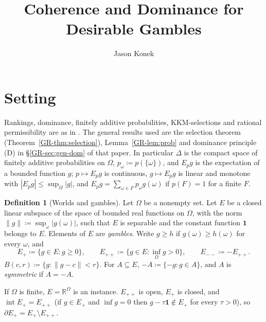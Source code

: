 \documentclass[11pt]{article}
\title{Coherence and Dominance for Desirable Gambles}
\author{Jason Konek}
\date{}
\newcommand{\chg}[1]{{\color{red}#1}}
\newcommand{\chgb}[1]{{\color{violet}#1}}
\theoremstyle{definition}
\newtheorem{definition}[theorem]{Definition}
\theoremstyle{remark}
\newcommand{\one}{\mathbf 1}
\newcommand{\R}{\mathbb R}
\newcommand{\interior}{\operatorname{int}}
\newcommand{\bd}{\partial}
\begin{document}
\maketitle


\section{Setting}\label{sec:setting}

Rankings, dominance, finitely additive probabilities, \chgb{KKM-selections} and rational permissibility are as in \cite{KonekGR}. \chg{The general results used are the selection theorem (Theorem~\ref{GR-thm:selection}), Lemma~\ref{GR-lem:prob} and dominance principle (D) in \S\ref{GR-sec:gen-dom} of that paper.} In particular $\Delta$ is the compact space of finitely additive probabilities on $\Omega$, $p_\omega\coloneqq p(\{\omega\})$, and $E_pg$ is the expectation of a bounded function $g$; $p\mapsto E_pg$ is continuous, $g\mapsto E_pg$ is linear and monotone with $|E_pg|\le\sup_\Omega|g|$, and $E_pg=\sum_{\omega\in F}p_\omega g(\omega)$ if $p(F)=1$ for a finite $F$.

\begin{definition}[Worlds and gambles]\label{def:gambles}
Let $\Omega$ be a nonempty set. Let $E$ be a closed linear subspace of the space of bounded real functions on $\Omega$, with the norm $\|g\|\coloneqq\sup_{\omega}|g(\omega)|$, such that $E$ is separable and the constant function $\one$ belongs to $E$. Elements of $E$ are \emph{gambles}. Write $g\ge h$ if $g(\omega)\ge h(\omega)$ for every $\omega$, and
\[
E_+\coloneqq\{g\in E:g\ge0\},\qquad E_{++}\coloneqq\{g\in E:\inf_\Omega g>0\},\qquad E_{--}\coloneqq-E_{++}.
\]
$B(c,r)\coloneqq\{g:\|g-c\|<r\}$. For $A\subseteq E$, $-A\coloneqq\{-g:g\in A\}$, and $A$ is \emph{symmetric} if $A=-A$.
\end{definition}

If $\Omega$ is finite, $E=\R^\Omega$ is an instance. $E_{++}$ is open, $E_+$ is closed, and $\interior E_+=E_{++}$ (if $g\in E_+$ and $\inf g=0$ then $g-\tau\one\notin E_+$ for every $\tau>0$), so $\bd E_+=E_+\setminus E_{++}$.
\end{document}
